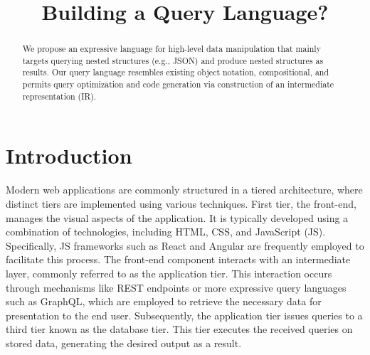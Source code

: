 \documentclass[runningheads]{llncs}
\begin{document}
%
\title{Building a Query Language?}

%
%
%
\maketitle              %
%
\begin{abstract}
We propose an expressive language for high-level data manipulation that
mainly targets querying nested structures (e.g., JSON) and produce nested
structures as results.
Our query language resembles existing object notation, compositional, and
permits query optimization and code generation via construction of an
intermediate representation (IR).


\end{abstract}
%
%
%
\section{Introduction}

Modern web applications are commonly structured in a tiered architecture, where distinct
tiers are implemented using various techniques.
First tier, the front-end, manages the visual aspects of the application.
It is typically developed using a combination of technologies, including HTML,
CSS, and JavaScript (JS).
Specifically, JS frameworks such as React and Angular are frequently employed to
facilitate this process.
The front-end component interacts with an intermediate layer, commonly referred to as
the application tier. 
This interaction occurs through mechanisms like REST endpoints or more expressive query
languages such as GraphQL, which are employed to retrieve the necessary data for
presentation to the end user.
Subsequently, the application tier issues queries to a third tier known as the database tier.
This tier executes the received queries on stored data, generating the desired output
as a result.
\end{document}
